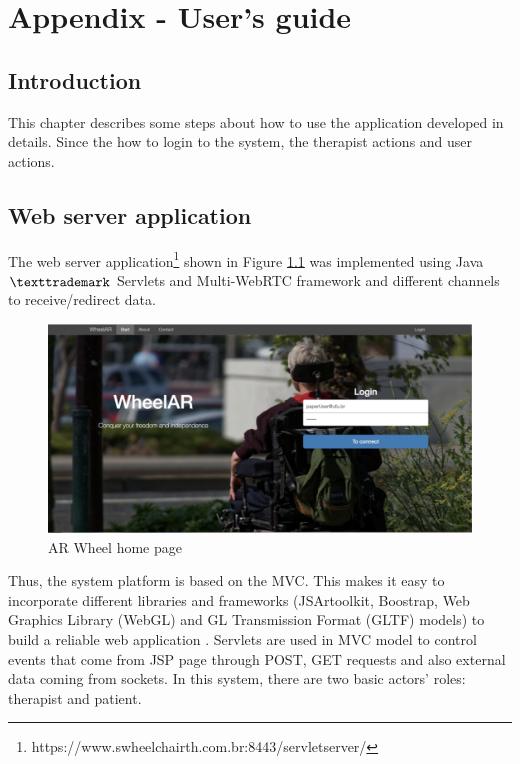 \chapter{Appendix - User's guide}
\label{sec:usersGuide}

\section{Introduction}
This chapter describes some steps about how to use the application developed in details. Since the how to login to the system, the therapist actions and user actions.

\section{Web server application}
\label{sec:implwebserver}

The web server application\footnote{https://www.swheelchairth.com.br:8443/servletserver/} shown in Figure \ref{fig:apDmainFrontSite} was implemented using Java$\texttrademark$  Servlets and Multi-WebRTC framework and different channels to receive/redirect data. 

\begin{figure}[!hbt]
\begin{center}
\includegraphics[width=1\linewidth]{img/apendiceD/mainFrontSite}
\caption{AR Wheel home page} \label{fig:apDmainFrontSite}
\end{center}
\end{figure}


Thus, the system platform is based on the MVC\cite{hansen2005}. This makes it easy to incorporate different libraries and frameworks (JSArtoolkit, Boostrap, Web Graphics Library (WebGL) and GL Transmission Format (GLTF) models) to build a reliable web application \cite{poltavskyi2020,zhou2019,mattioli2019,aquino2016}. Servlets are used in MVC model to control events that come from JSP page through POST, GET requests and also external data coming from sockets. In this system, there are two basic actors' roles: therapist and patient.

